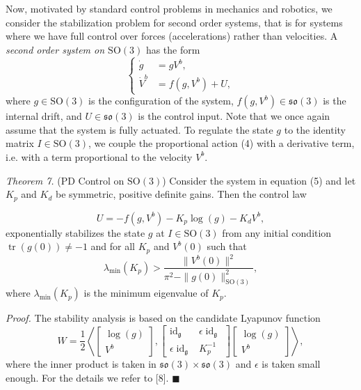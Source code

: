\documentclass[10pt,twocolumn]{article}
\newcommand{\SO}{\mathrm{SO}}
\newcommand{\so}{\mathfrak{so}}
\newcommand{\gfrak}{\mathfrak g}
\newcommand{\tr}{\operatorname{tr}}
\newcommand{\idg}{\operatorname{id}_{\gfrak}}
\newcommand{\paperhead}[2]{\par\medskip\noindent\textit{#1} #2\par}
\newcommand{\proofbox}{\hfill$\blacksquare$}
\begin{document}
Now, motivated by standard control problems in mechanics and robotics, we consider the stabilization problem for second order systems, that is for systems where we have full control over forces (accelerations) rather than velocities. A \emph{second order system on $\SO(3)$} has the form
\begin{equation*}
\left\{\begin{aligned}
\dot g&=gV^b,\\
\dot V^b&=f(g,V^b)+U,
\end{aligned}\right.\tag{5}
\end{equation*}
where $g\in\SO(3)$ is the configuration of the system, $f(g,V^b)\in\so(3)$ is the internal drift, and $U\in\so(3)$ is the control input. Note that we once again assume that the system is fully actuated. To regulate the state $g$ to the identity matrix $I\in\SO(3)$, we couple the proportional action (4) with a derivative term, i.e. with a term proportional to the velocity $V^b$.

\paperhead{Theorem 7.}{(PD Control on $\SO(3)$) Consider the system in equation (5) and let $K_p$ and $K_d$ be symmetric, positive definite gains. Then the control law}
\begin{equation*}
U=-f(g,V^b)-K_p\log(g)-K_dV^b,\tag{6}
\end{equation*}
exponentially stabilizes the state $g$ at $I\in\SO(3)$ from any initial condition $\tr(g(0))\neq-1$ and for all $K_p$ and $V^b(0)$ such that
\begin{equation*}
\lambda_{\min}(K_p)>\frac{\|V^b(0)\|^2}{\pi^2-\|g(0)\|_{\SO(3)}^2},
\end{equation*}
where $\lambda_{\min}(K_p)$ is the minimum eigenvalue of $K_p$.

\noindent\textit{Proof.} The stability analysis is based on the candidate Lyapunov function
\begin{equation*}
W=\frac12\left\langle
\begin{bmatrix}\log(g)\\V^b\end{bmatrix},
\begin{bmatrix}
\idg&\epsilon\idg\\
\epsilon\idg&K_p^{-1}
\end{bmatrix}
\begin{bmatrix}\log(g)\\V^b\end{bmatrix}
\right\rangle,
\end{equation*}
where the inner product is taken in $\so(3)\times\so(3)$ and $\epsilon$ is taken small enough. For the details we refer to [8]. \proofbox
\end{document}
